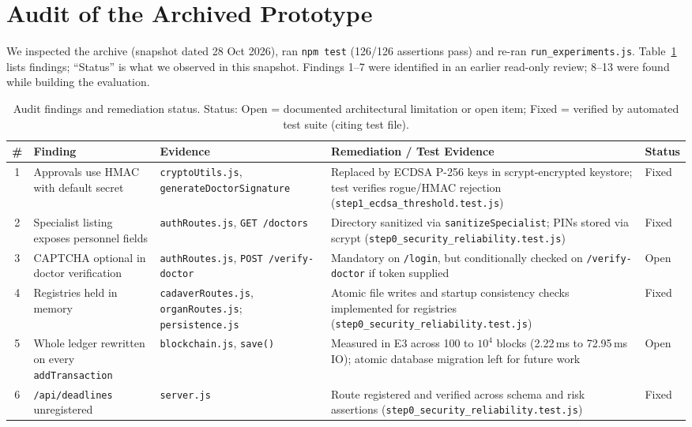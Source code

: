 \documentclass[journal]{IEEEtran}
\begin{document}
\section{Audit of the Archived Prototype}\label{sec:audit}
We inspected the archive (snapshot dated 28 Oct 2026), ran
\texttt{npm test} (126/126 assertions pass) and re-ran
\texttt{run\_experiments.js}. Table~\ref{tab:audit} lists findings; ``Status''
is what we observed in this snapshot. Findings 1--7 were identified in an
earlier read-only review; 8--13 were found while building the evaluation.

\begin{table}[t]
\centering
\caption{Audit findings and remediation status. Status: Open = documented architectural limitation or open item; Fixed = verified by automated test suite (citing test file).}
\label{tab:audit}
\footnotesize
\begin{tabular}{@{}cp{3.0cm}p{4.2cm}p{5.4cm}l@{}}
\toprule
\# & Finding & Evidence & Remediation / Test Evidence & Status \\
\midrule
1 & Approvals use HMAC with default secret & \texttt{cryptoUtils.js}, \texttt{generateDoctorSignature} & Replaced by ECDSA P-256 keys in scrypt-encrypted keystore; test verifies rogue/HMAC rejection (\texttt{step1\_ecdsa\_threshold.test.js}) & Fixed \\
2 & Specialist listing exposes personnel fields & \texttt{authRoutes.js}, \texttt{GET /doctors} & Directory sanitized via \texttt{sanitizeSpecialist}; PINs stored via scrypt (\texttt{step0\_security\_reliability.test.js}) & Fixed \\
3 & CAPTCHA optional in doctor verification & \texttt{authRoutes.js}, \texttt{POST /verify-doctor} & Mandatory on \texttt{/login}, but conditionally checked on \texttt{/verify-doctor} if token supplied & Open \\
4 & Registries held in memory & \texttt{cadaverRoutes.js}, \texttt{organRoutes.js}; \texttt{persistence.js} & Atomic file writes and startup consistency checks implemented for registries (\texttt{step0\_security\_reliability.test.js}) & Fixed \\
5 & Whole ledger rewritten on every \texttt{addTransaction} & \texttt{blockchain.js}, \texttt{save()} & Measured in E3 across 100 to $10^4$ blocks (2.22\,ms to 72.95\,ms IO); atomic database migration left for future work & Open \\
6 & \texttt{/api/deadlines} unregistered & \texttt{server.js} & Route registered and verified across schema and risk assertions (\texttt{step0\_security\_reliability.test.js}) & Fixed \\

\end{tabular}
\end{table}
\end{document}
